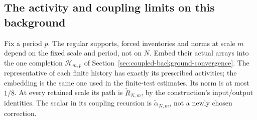 \subsection{The activity and coupling limits on this background}
Fix a period $p$. The regular supports, forced inventories and norms
at scale $m$ depend on the fixed scale and period, not on $N$.
Embed their actual arrays into the one completion $\mathcal H_{m,p}$
of Section~\ref{sec:coupled-background-convergence}. The representative
of each finite history has exactly its prescribed activities; the
embedding is the same one used in the finite-test estimates. Its
norm is at most $1/8$. At every retained scale its path is
$\widetilde R_{N,m}$, by the construction's input/output identities.
The scalar in its coupling recursion is
$\widetilde\alpha_{N,m}$, not a newly chosen correction.

